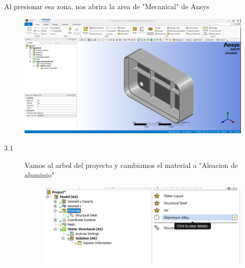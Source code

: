 \documentclass{article}
\begin{document}
\begin{description}
    Al presionar esa zona, nos abrira la area de "Mecanical" de Ansys 

    \newpage

    \bigskip

    \begin{figure}[h!]
        \centering
        \includegraphics[scale=0.5]{img/mecanical.png}
    \end{figure}

    \begin{description}
        \item[3.1 ] Vamos al arbol del proyecto y cambiamos el material a "Aleacion de aluminio" 
        
        \begin{figure}[h!]
            \centering
            \includegraphics{img/agregarMaterial.png}
        \end{figure}

        \newpage


\end{description}
\end{description}
\end{document}
